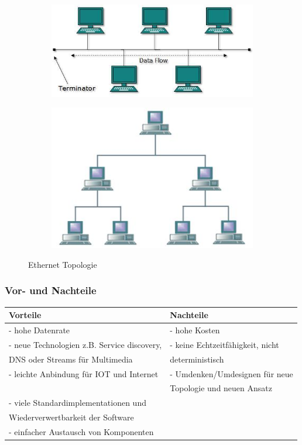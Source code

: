 \begin{figure}[h!]
	\centering
	\begin{subfigure}[b]{0.4\textwidth}
		\includegraphics[width=\linewidth]{bus_topology.jpg}
	\end{subfigure}
	\begin{subfigure}[b]{0.4\textwidth}
		\includegraphics[width=\linewidth]{tree_topology.jpg}
	\end{subfigure}
	\caption{Ethernet Topologie}
\end{figure}

\subsubsection{Vor- und Nachteile}
\begin{tabular}{l|l}
	Vorteile & Nachteile\\
	\hline - hohe Datenrate & - hohe Kosten\\
	\hline - neue Technologien z.B. Service discovery,  & - keine Echtzeitfähigkeit, nicht\\
	DNS oder Streams für Multimedia & deterministisch\\
	\hline - leichte Anbindung für IOT und Internet & - Umdenken/Umdesignen für neue \\
	& Topologie und neuen Ansatz\\
	\hline - viele Standardimplementationen und&\\
	Wiederverwertbarkeit der Software&\\
	\hline - einfacher Austausch von Komponenten &\\
\end{tabular}

